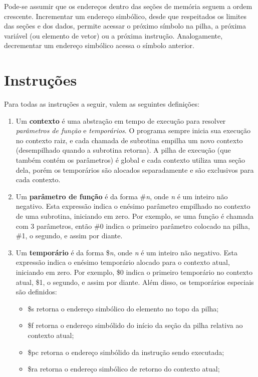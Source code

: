 \documentclass[12pt,a4paper,extrafontsizes,article]{memoir}
\newcommand*{\srcfont}{\fontfamily{pcr}\selectfont}
\begin{document}
Pode-se assumir que os endereços dentro das seções de memória seguem a ordem crescente. Incrementar um endereço
simbólico, desde que respeitados os limites das seções e dos dados, permite acessar o próximo símbolo na pilha, a
próxima variável (ou elemento de vetor) ou a próxima instrução. Analogamente, decrementar um endereço simbólico acessa o
símbolo anterior.

\clearpage
\chapter{Instruções}
\label{chp:instructions}

Para todas as instruções a seguir, valem as seguintes definições:
\begin{enumerate}
  \item Um \textbf{contexto} é uma abstração em tempo de execução para resolver \textit{parâmetros de função} e
  \textit{temporários}. O programa sempre inicia sua execução no contexto raiz, e cada chamada de subrotina empilha um
  novo contexto (desempilhado quando a subrotina retorna). A pilha de execução (que também contém os parâmetros) é
  global e cada contexto utiliza uma seção dela, porém os temporários são alocados separadamente e são exclusivos para
  cada contexto.
  
  \item Um \textbf{parâmetro de função} é da forma {\srcfont \#\textit{n}}, onde \textit{n} é um inteiro não negativo.
  Esta expressão indica o enésimo parâmetro empilhado no contexto de uma subrotina, iniciando em zero. Por exemplo, se
  uma função é chamada com 3 parâmetros, então {\srcfont \#0} indica o primeiro pa\-râ\-me\-tro colocado na pilha, {\srcfont
  \#1}, o segundo, e assim por diante.
  
  \item Um \textbf{temporário} é da forma {\srcfont \$\textit{n}}, onde \textit{n} é um inteiro não negativo.
  Esta expressão indica o enésimo temporário alocado para o contexto atual, iniciando em zero. Por exemplo, {\srcfont
  \$0} indica o primeiro temporário no contexto atual, {\srcfont \$1}, o segundo, e assim por diante. Além disso, os
  temporários especiais são definidos:
  \begin{itemize}
    \item {\srcfont \$s} retorna o endereço simbólico do elemento no topo da pilha;
    \item {\srcfont \$f} retorna o endereço simbólido do início da seção da pilha relativa ao contexto atual;
    \item {\srcfont \$pc} retorna o endereço simbólido da instrução sendo executada;
    \item {\srcfont \$ra} retorna o endereço simbólico de retorno do contexto atual;
  \end{itemize}
  

\end{enumerate}
\end{document}
